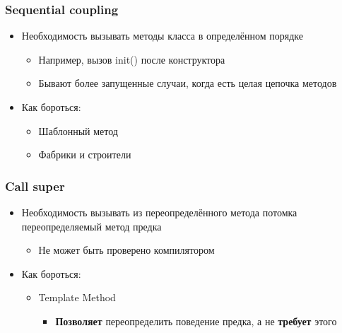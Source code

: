 \documentclass{../../slides-style}
\begin{document}
    \begin{frame}
        \frametitle{Sequential coupling}
        \begin{itemize}
            \item Необходимость вызывать методы класса в определённом порядке
            \begin{itemize}
                \item Например, вызов init() после конструктора
                \item Бывают более запущенные случаи, когда есть целая цепочка методов
            \end{itemize}
            \item Как бороться:
            \begin{itemize}
                \item Шаблонный метод
                \item Фабрики и строители
            \end{itemize}
        \end{itemize}
    \end{frame}

    \begin{frame}
        \frametitle{Call super}
        \begin{itemize}
            \item Необходимость вызывать из переопределённого метода потомка переопределяемый метод предка
            \begin{itemize}
                \item Не может быть проверено компилятором
            \end{itemize}
            \item Как бороться:
            \begin{itemize}
                \item Template Method
                \begin{itemize}
                    \item \textbf{Позволяет} переопределить поведение предка, а не \textbf{требует} этого
                \end{itemize}
            \end{itemize}
        \end{itemize}
    \end{frame}
\end{document}
